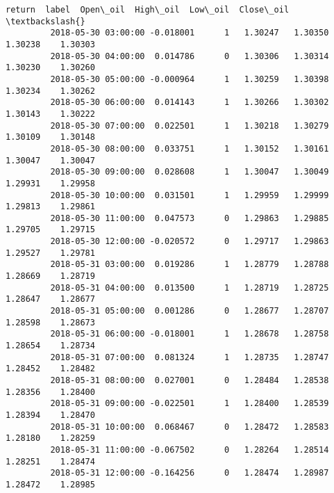 \documentclass[11pt]{article}
\begin{document}
\begin{Verbatim}[commandchars=\\\{\}]
                                return  label  Open\_oil  High\_oil  Low\_oil  Close\_oil  \textbackslash{}
         2018-05-30 03:00:00 -0.018001      1   1.30247   1.30350  1.30238    1.30303   
         2018-05-30 04:00:00  0.014786      0   1.30306   1.30314  1.30230    1.30260   
         2018-05-30 05:00:00 -0.000964      1   1.30259   1.30398  1.30234    1.30262   
         2018-05-30 06:00:00  0.014143      1   1.30266   1.30302  1.30143    1.30222   
         2018-05-30 07:00:00  0.022501      1   1.30218   1.30279  1.30109    1.30148   
         2018-05-30 08:00:00  0.033751      1   1.30152   1.30161  1.30047    1.30047   
         2018-05-30 09:00:00  0.028608      1   1.30047   1.30049  1.29931    1.29958   
         2018-05-30 10:00:00  0.031501      1   1.29959   1.29999  1.29813    1.29861   
         2018-05-30 11:00:00  0.047573      0   1.29863   1.29885  1.29705    1.29715   
         2018-05-30 12:00:00 -0.020572      0   1.29717   1.29863  1.29527    1.29781   
         2018-05-31 03:00:00  0.019286      1   1.28779   1.28788  1.28669    1.28719   
         2018-05-31 04:00:00  0.013500      1   1.28719   1.28725  1.28647    1.28677   
         2018-05-31 05:00:00  0.001286      0   1.28677   1.28707  1.28598    1.28673   
         2018-05-31 06:00:00 -0.018001      1   1.28678   1.28758  1.28654    1.28734   
         2018-05-31 07:00:00  0.081324      1   1.28735   1.28747  1.28452    1.28482   
         2018-05-31 08:00:00  0.027001      0   1.28484   1.28538  1.28356    1.28400   
         2018-05-31 09:00:00 -0.022501      1   1.28400   1.28539  1.28394    1.28470   
         2018-05-31 10:00:00  0.068467      0   1.28472   1.28583  1.28180    1.28259   
         2018-05-31 11:00:00 -0.067502      0   1.28264   1.28514  1.28251    1.28474   
         2018-05-31 12:00:00 -0.164256      0   1.28474   1.28987  1.28472    1.28985   
         

\end{Verbatim}
\end{document}
